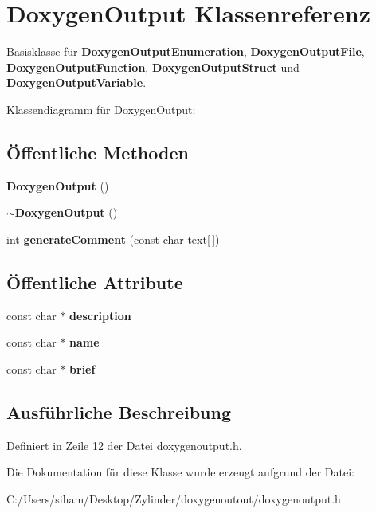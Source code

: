 \section{Doxygen\-Output Klassenreferenz}
\label{class_doxygen_output}
Basisklasse f\"{u}r {\bf Doxygen\-Output\-Enumeration}, {\bf Doxygen\-Output\-File}, {\bf Doxygen\-Output\-Function}, {\bf Doxygen\-Output\-Struct} und {\bf Doxygen\-Output\-Variable}.

Klassendiagramm f\"{u}r Doxygen\-Output:\subsection*{\"{O}ffentliche Methoden}
\begin{CompactItemize}
\item 
{\bf Doxygen\-Output} ()\label{class_doxygen_output_4ad9fe481e706ad589aa146a0b476885}

\item 
{\bf $\sim$Doxygen\-Output} ()\label{class_doxygen_output_7857a9bd4f9ac6865939ba61f64673da}

\item 
int {\bf generate\-Comment} (const char text[$\,$])\label{class_doxygen_output_580ddb53643bfacb31497bf9ed5bad44}

\end{CompactItemize}
\subsection*{\"{O}ffentliche Attribute}
\begin{CompactItemize}
\item 
const char $\ast$ {\bf description}\label{class_doxygen_output_67daf92c833c41c95db874e18fcb2786}

\item 
const char $\ast$ {\bf name}\label{class_doxygen_output_b068931cc450442b63f5b3d276ea4297}

\item 
const char $\ast$ {\bf brief}\label{class_doxygen_output_106f16a8fde7ae2ecac302abf5b49a90}

\end{CompactItemize}


\subsection{Ausf\"{u}hrliche Beschreibung}




Definiert in Zeile 12 der Datei doxygenoutput.h.

Die Dokumentation f\"{u}r diese Klasse wurde erzeugt aufgrund der Datei:\begin{CompactItemize}
\item 
C:/Users/siham/Desktop/Zylinder/doxygenoutout/doxygenoutput.h\end{CompactItemize}
